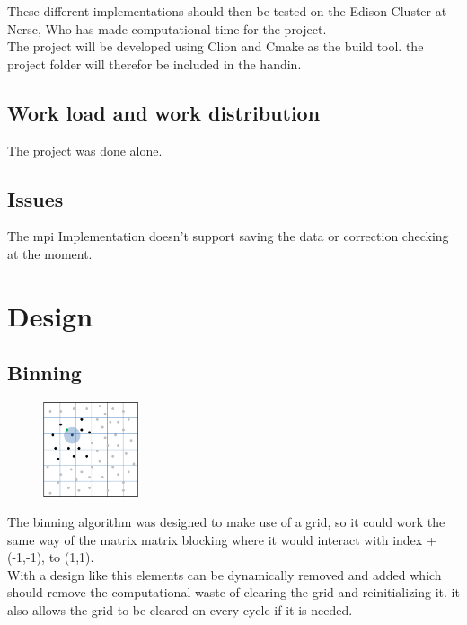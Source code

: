 \documentclass[a4paper,10pt,titlepage]{report}
\begin{document}
These different implementations should then be tested on the Edison Cluster at Nersc, Who has made computational time for the project. \\

The project will be developed using Clion and Cmake as the build tool. the project folder will therefor be included in the handin. \\

\subsection{Work load and work distribution}
The project was done alone. 

\subsection{Issues}
The mpi Implementation doesn't support saving the data or correction checking at the moment.

\newpage

\section{Design}

\subsection{Binning}
\begin{figure} %
    \centering
    \includegraphics[width=0.25\textwidth]{grid.png}
\end{figure}
The binning algorithm was designed to make use of a grid, so it could work the same way of the matrix matrix blocking where it would interact with index +(-1,-1), to (1,1). \\

With a design like this elements can be dynamically removed and added which should remove the computational waste of clearing the grid and reinitializing it. it also allows the grid to be cleared on every cycle if it is needed. \\
\end{document}
